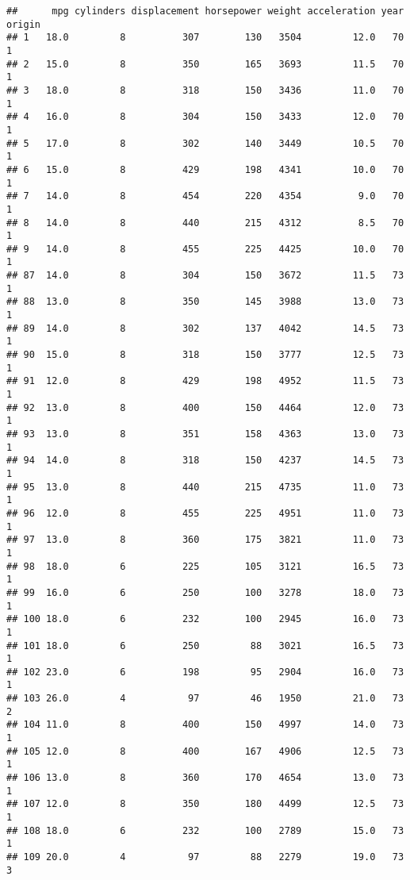 \documentclass[
]{article}
\begin{document}
\begin{verbatim}
##      mpg cylinders displacement horsepower weight acceleration year origin
## 1   18.0         8          307        130   3504         12.0   70      1
## 2   15.0         8          350        165   3693         11.5   70      1
## 3   18.0         8          318        150   3436         11.0   70      1
## 4   16.0         8          304        150   3433         12.0   70      1
## 5   17.0         8          302        140   3449         10.5   70      1
## 6   15.0         8          429        198   4341         10.0   70      1
## 7   14.0         8          454        220   4354          9.0   70      1
## 8   14.0         8          440        215   4312          8.5   70      1
## 9   14.0         8          455        225   4425         10.0   70      1
## 87  14.0         8          304        150   3672         11.5   73      1
## 88  13.0         8          350        145   3988         13.0   73      1
## 89  14.0         8          302        137   4042         14.5   73      1
## 90  15.0         8          318        150   3777         12.5   73      1
## 91  12.0         8          429        198   4952         11.5   73      1
## 92  13.0         8          400        150   4464         12.0   73      1
## 93  13.0         8          351        158   4363         13.0   73      1
## 94  14.0         8          318        150   4237         14.5   73      1
## 95  13.0         8          440        215   4735         11.0   73      1
## 96  12.0         8          455        225   4951         11.0   73      1
## 97  13.0         8          360        175   3821         11.0   73      1
## 98  18.0         6          225        105   3121         16.5   73      1
## 99  16.0         6          250        100   3278         18.0   73      1
## 100 18.0         6          232        100   2945         16.0   73      1
## 101 18.0         6          250         88   3021         16.5   73      1
## 102 23.0         6          198         95   2904         16.0   73      1
## 103 26.0         4           97         46   1950         21.0   73      2
## 104 11.0         8          400        150   4997         14.0   73      1
## 105 12.0         8          400        167   4906         12.5   73      1
## 106 13.0         8          360        170   4654         13.0   73      1
## 107 12.0         8          350        180   4499         12.5   73      1
## 108 18.0         6          232        100   2789         15.0   73      1
## 109 20.0         4           97         88   2279         19.0   73      3

\end{verbatim}
\end{document}
